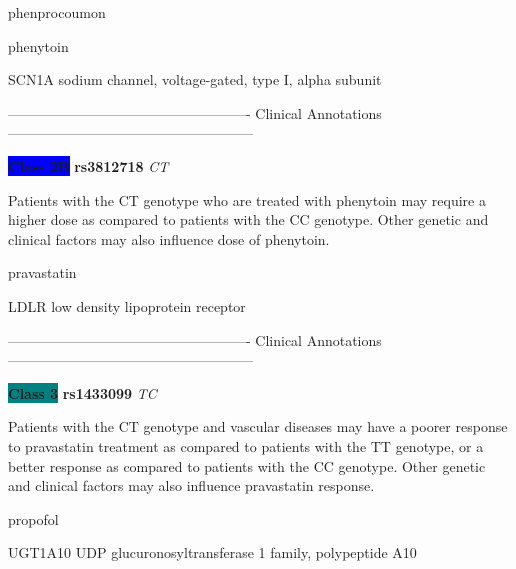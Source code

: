 \documentclass{resume} %
\begin{document}
\begin{rSection}{ phenprocoumon }
\end{rSection}\begin{rSection}{ phenytoin }
\item[]

\begin{rSubsection}{ SCN1A }{ sodium channel, voltage-gated, type I, alpha subunit }{}{}
\item[]

\item[] ---------------------------------------------------- Clinical Annotations -----------------------------------------------------\newline
\item \textbf{\colorbox{blue} {Class 2B}} \textbf{ rs3812718 } \textit{ CT }
\item[] Patients with the CT genotype who are treated with phenytoin may require a higher dose as compared to patients with the CC genotype. Other genetic and clinical factors may also influence dose of phenytoin.
\end{rSubsection}

\end{rSection}\begin{rSection}{ pravastatin }
\item[]

\begin{rSubsection}{ LDLR }{ low density lipoprotein receptor }{}{}
\item[]

\item[] ---------------------------------------------------- Clinical Annotations -----------------------------------------------------\newline
\item \textbf{\colorbox{teal} {Class 3}} \textbf{ rs1433099 } \textit{ TC }
\item[] Patients with the CT genotype and vascular diseases may have a poorer response to pravastatin treatment as compared to patients with the TT genotype, or a better response as compared to patients with the CC genotype. Other genetic and clinical factors may also influence pravastatin response. 
\end{rSubsection}

\end{rSection}\begin{rSection}{ propofol }
\item[]

\begin{rSubsection}{ UGT1A10 }{ UDP glucuronosyltransferase 1 family, polypeptide A10 }{}{}
\item[]


\end{rSubsection}
\end{rSection}
\end{document}
